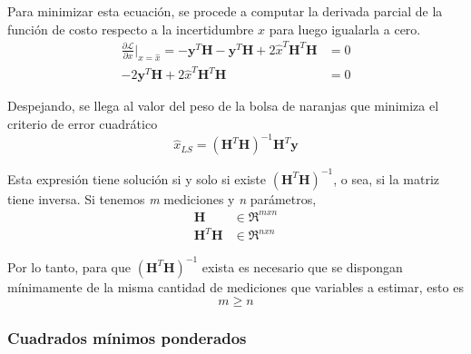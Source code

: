 Para minimizar esta ecuación, se procede a computar la derivada parcial de la función de costo respecto a la incertidumbre $x$ para luego igualarla a cero.
\begin{align}
    \frac{\partial \mathscr{L}}{\partial x}\bigg\rvert_{x=\hat{x}} = -\textbf{y}^T\textbf{H} - \textbf{y}^T\textbf{H} + 2\hat{x}^T\textbf{H}^T\textbf{H} &= 0 \\
    -2\textbf{y}^T\textbf{H} + 2\hat{x}^T\textbf{H}^T\textbf{H} &= 0
\end{align}

Despejando, se llega al valor del peso de la bolsa de naranjas que minimiza el criterio de error cuadrático
\begin{equation}
    \hat{x}_{LS} = (\textbf{H}^T\textbf{H})^{-1}\textbf{H}^T\textbf{y}
\end{equation}

Esta expresión tiene solución si y solo si existe $(\textbf{H}^T\textbf{H})^{-1}$, o sea, si la matriz tiene inversa. Si tenemos \textit{m} mediciones y \textit{n} parámetros,
\begin{align*}
    \textbf{H} &\in \Re^{mxn} \\
    \textbf{H}^T\textbf{H} &\in \Re^{nxn}
\end{align*}

Por lo tanto, para que $(\textbf{H}^T\textbf{H})^{-1}$ exista es necesario que se dispongan mínimamente de la misma cantidad de mediciones que variables a estimar, esto es
\begin{equation*}
    m \geq n
\end{equation*}

\subsubsection{Cuadrados mínimos ponderados}

